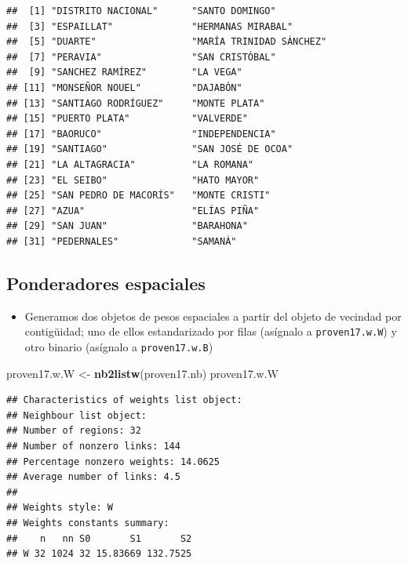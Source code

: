 \documentclass[11pt,]{article}
\newenvironment{Shaded}{\begin{snugshade}}{\end{snugshade}}
\newcommand{\KeywordTok}[1]{\textcolor[rgb]{0.13,0.29,0.53}{\textbf{#1}}}
\newcommand{\StringTok}[1]{\textcolor[rgb]{0.31,0.60,0.02}{#1}}
\newcommand{\NormalTok}[1]{#1}
\providecommand{\tightlist}{%
\setlength{\itemsep}{0pt}\setlength{\parskip}{0pt}}
\begin{document}
\begin{verbatim}
##  [1] "DISTRITO NACIONAL"      "SANTO DOMINGO"         
##  [3] "ESPAILLAT"              "HERMANAS MIRABAL"      
##  [5] "DUARTE"                 "MARÍA TRINIDAD SÁNCHEZ"
##  [7] "PERAVIA"                "SAN CRISTÓBAL"         
##  [9] "SANCHEZ RAMÍREZ"        "LA VEGA"               
## [11] "MONSEÑOR NOUEL"         "DAJABÓN"               
## [13] "SANTIAGO RODRÍGUEZ"     "MONTE PLATA"           
## [15] "PUERTO PLATA"           "VALVERDE"              
## [17] "BAORUCO"                "INDEPENDENCIA"         
## [19] "SANTIAGO"               "SAN JOSÉ DE OCOA"      
## [21] "LA ALTAGRACIA"          "LA ROMANA"             
## [23] "EL SEIBO"               "HATO MAYOR"            
## [25] "SAN PEDRO DE MACORÍS"   "MONTE CRISTI"          
## [27] "AZUA"                   "ELÍAS PIÑA"            
## [29] "SAN JUAN"               "BARAHONA"              
## [31] "PEDERNALES"             "SAMANÁ"
\end{verbatim}

\subsection{Ponderadores espaciales}\label{ponderadores-espaciales}

\begin{itemize}
\tightlist
\item
  Generamos dos objetos de pesos espaciales a partir del objeto de
  vecindad por contigüidad; uno de ellos estandarizado por filas
  (asígnalo a \texttt{proven17.w.W}) y otro binario (asígnalo a
  \texttt{proven17.w.B})
\end{itemize}

\begin{Shaded}
\begin{Highlighting}[]
\NormalTok{proven17.w.W <-}\StringTok{ }\KeywordTok{nb2listw}\NormalTok{(proven17.nb)}
\NormalTok{proven17.w.W}
\end{Highlighting}
\end{Shaded}

\begin{verbatim}
## Characteristics of weights list object:
## Neighbour list object:
## Number of regions: 32 
## Number of nonzero links: 144 
## Percentage nonzero weights: 14.0625 
## Average number of links: 4.5 
## 
## Weights style: W 
## Weights constants summary:
##    n   nn S0       S1       S2
## W 32 1024 32 15.83669 132.7525
\end{verbatim}
\end{document}
